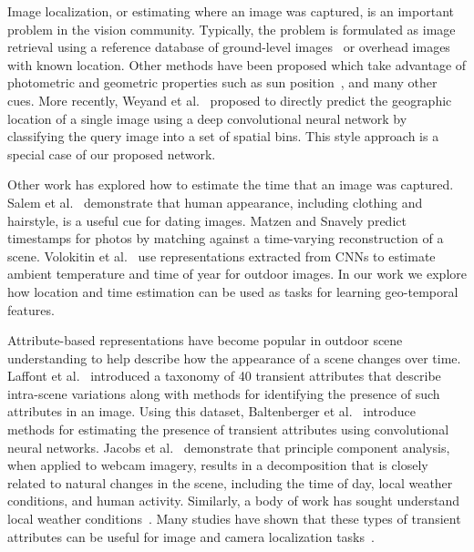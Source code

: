 Image localization, or estimating where an image was captured, is an
important problem in the vision community. Typically, the problem is
formulated as image retrieval using a reference database of
ground-level images~\cite{im2gps} or overhead
images~\cite{lin2015learning,workman2015geocnn,workman2015localize}
with known location.  Other methods have been proposed which take
advantage of photometric and geometric properties such as sun
position~\cite{lalonde2010sun,workman2014rainbow}, and many other
cues. More recently, Weyand et al.~\cite{planet} proposed to directly
predict the geographic location of a single image using a deep
convolutional neural network by classifying the query image into a set
of spatial bins. This style approach is a special case of our proposed
network.

Other work has explored how to estimate the time that an image was
captured. Salem et al.~\cite{salem2016dating} demonstrate that human
appearance, including clothing and hairstyle, is a useful cue for
dating images. Matzen and Snavely predict timestamps for photos by
matching against a time-varying reconstruction of a scene.  Volokitin
et al.~\cite{eth_biwi_01292} use representations extracted from CNNs
to estimate ambient temperature and time of year for outdoor images.
In our work we explore how location and time estimation can be used
as tasks for learning geo-temporal features. 

Attribute-based representations have become popular in outdoor scene
understanding to help describe how the appearance of a scene changes
over time. Laffont et al.~\cite{laffont2014transient} introduced a taxonomy
of 40 transient attributes that describe intra-scene variations along
with methods for identifying the presence of such attributes in an
image. Using this dataset, Baltenberger et
al.~\cite{baltenberger16transient} introduce methods for estimating
the presence of transient attributes using convolutional neural
networks. Jacobs et al.~\cite{jacobs07amos} demonstrate
that principle component analysis, when applied to webcam imagery,
results in a decomposition that is closely related to natural changes
in the scene, including the time of day, local weather conditions, and
human activity. Similarly, a body of work has sought understand local
weather conditions~\cite{islam13webcamweather,lu2014two}. Many studies
have shown that these types of transient attributes can be useful for
image and camera localization
tasks~\cite{jacobs07geolocate,baltenberger16transient}.

